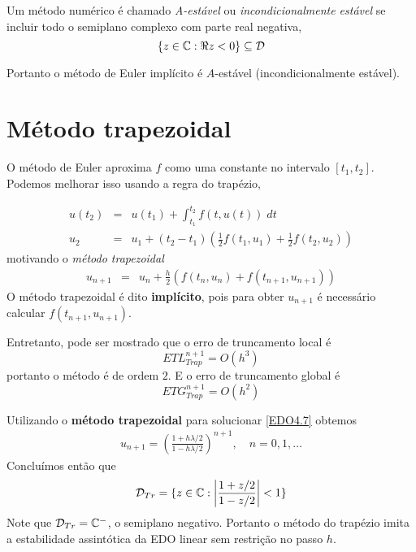 \begin{defn}
Um método numérico é chamado \emph{A-estável} ou \emph{incondicionalmente estável} se incluir todo o semiplano complexo com parte real negativa,
$$    \{z \in \mathbb{C}: \Re{z}<0\} \subseteq \mathcal D$$
\end{defn}


Portanto o método de Euler implícito é $A$-estável (incondicionalmente estável).


\section{Método trapezoidal}
O método de Euler aproxima $f$ como uma constante no intervalo $[t_1,t_2]$. Podemos melhorar isso usando a regra do trapézio,

\begin{eqnarray}
  u(t_2) &=& u(t_1) +  \int _{t_1}^{t_2}  f(t,u(t)) \; dt \\
  u_2    &=&   u_1  +  (t_2-t_1)\left(\frac{1}{2}f(t_1,u_1)+\frac{1}{2}f(t_2,u_2)\right)
\end{eqnarray}
motivando o \emph{método trapezoidal}
\begin{eqnarray}
  u_{n+1} &=& u_n +  \frac{h}{2} \left(f(t_n,u_n)+f(t_{n+1},u_{n+1})\right)
\end{eqnarray}
O método trapezoidal é dito \textbf{implícito}, pois para obter $u_{n+1}$ é necessário calcular $f(t_{n+1},u_{n+1})$.

Entretanto, pode ser mostrado que o erro de truncamento local é
$$ETL_{Trap}^{n+1}= O(h^3)$$
portanto o método é de ordem $2$. E o erro de truncamento global é
$$ETG_{Trap}^{n+1}= O(h^2)$$


\begin{ex}
Utilizando o \textbf{método trapezoidal} para solucionar \eqref{EDO4.7} obtemos
\begin{eqnarray}
 u_{n+1} = \left(\frac{1+ h\lambda /2}{1- h\lambda /2}\right)^{n+1}, \quad  n=0,1,\ldots
\end{eqnarray}
Concluímos então que
\begin{eqnarray}
 \mathcal D_{Tr} = \{z \in  \mathbb{C}:  \left|\frac{1+ z/2}{1- z/2}\right|<1\}
\end{eqnarray}
Note que $\mathcal D_{Tr}=\mathbb{C}^-$, o semiplano negativo. Portanto o método do trapézio imita a estabilidade assintótica da EDO linear sem restrição no passo $h$.
\end{ex}



